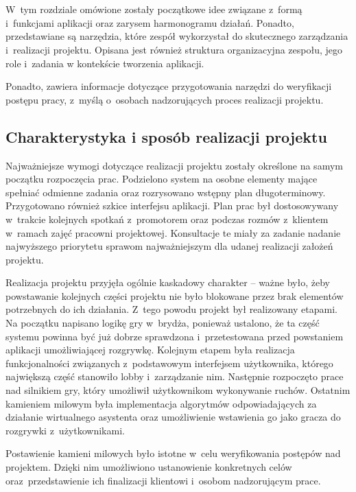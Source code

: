 \chapter{\ChapterTitleWorkOrganization}
\label{sec:organizacja-pracy}

W~tym rozdziale omówione zostały początkowe idee związane z~formą i~funkcjami
aplikacji oraz zarysem harmonogramu działań. Ponadto, przedstawiane
są narzędzia, które zespół wykorzystał do skutecznego zarządzania
i~realizacji projektu. Opisana jest również struktura organizacyjna
zespołu, jego role i~zadania w kontekście tworzenia aplikacji.

Ponadto, zawiera informacje dotyczące przygotowania narzędzi do
weryfikacji postępu pracy, z~myślą o~osobach nadzorujących proces
realizacji projektu.

\section{Charakterystyka i sposób realizacji projektu}

Najważniejsze wymogi dotyczące realizacji projektu
zostały określone na samym początku rozpoczęcia prac. Podzielono system na osobne elementy
mające spełniać odmienne zadania oraz rozrysowano wstępny plan długoterminowy. Przygotowano
również szkice interfejsu aplikacji. Plan prac był dostosowywany w~trakcie
kolejnych spotkań z~promotorem oraz
podczas rozmów z~klientem w~ramach zajęć pracowni projektowej.
Konsultacje te miały za zadanie nadanie najwyższego priorytetu
sprawom najważniejszym
dla udanej realizacji założeń projektu.

Realizacja projektu przyjęła ogólnie kaskadowy charakter --
ważne było, żeby powstawanie kolejnych części projektu nie było blokowane przez
brak elementów potrzebnych do ich działania. Z~tego powodu projekt był realizowany
etapami. Na początku napisano logikę gry w~brydża, ponieważ ustalono, że ta część
systemu powinna być już dobrze sprawdzona i~przetestowana przed powstaniem
aplikacji umożliwiającej rozgrywkę. Kolejnym etapem była realizacja funkcjonalności
związanych z~podstawowym interfejsem użytkownika, którego największą część
stanowiło lobby i~zarządzanie nim. Następnie rozpoczęto prace nad silnikiem gry, który
umożliwił użytkownikom wykonywanie ruchów. Ostatnim kamieniem milowym była implementacja
algorytmów odpowiadających za działanie wirtualnego asystenta oraz umożliwienie
wstawienia go jako gracza do rozgrywki z~użytkownikami.

Postawienie kamieni milowych było istotne w~celu weryfikowania postępów
nad projektem. Dzięki nim umożliwiono ustanowienie konkretnych celów oraz~przedstawienie
ich finalizacji klientowi i~osobom nadzorującym prace.

